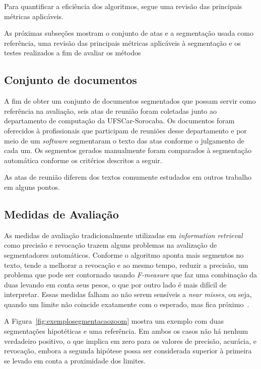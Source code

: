 Para quantificar a eficiência dos algoritmos, segue uma revisão das principais métricas aplicáveis.

As próximas subseções mostram o conjunto de atas e a segmentação usada como referência, uma revisão das principais métricas aplicáveis à segmentação e os testes realizados a fim de avaliar os métodos

\subsection{Conjunto de documentos}
	A fim de obter um conjunto de documentos segmentados que possam servir como referência na avaliação, seis atas de reunião foram coletadas junto ao departamento de computação da UFSCar-Sorocaba. Os documentos foram oferecidos à profissionais que participam de reuniões desse departamento e por meio de um \textit{software} segmentaram o texto das atas conforme o julgamento de cada um. Os segmentos gerados manualmente foram comparados à segmentação automática conforme os critérios descritos a seguir.
	
	As atas de reunião diferem dos textos comumente estudados em outros trabalho em alguns pontos.
	


\subsection{Medidas de Avaliação}


	As medidas de avaliação tradicionalmente utilizadas em \textit{information retrieval} como precisão e revocação trazem alguns problemas na avalização de segmentadores automáticos.  
Conforme o algoritmo aponta mais segmentos no texto, tende a melhorar a revocação e ao mesmo tempo, reduzir a precisão, um problema que pode ser contornado usando \textit{F-measure} que faz uma combinação da duas levando em conta seus pesos, o que por outro lado é mais difícil de interpretar. 
Essas medidas falham ao não serem sensíveis a \textit{near misses}, ou seja, quando um limite não coincide exatamente com o esperado, mas fica próximo~\cite{Kern2009}.

A Figura~\ref{fig:exemplosegmentacaozoom} mostra um exemplo com duas segmentações hipotéticas e uma referência. Em ambos os casos não há nenhum verdadeiro positivo, o que implica em zero para os valores de precisão, acurácia, e revocação, embora a segunda hipótese possa ser considerada superior à primeira se levado em conta a proximidade dos limites.




